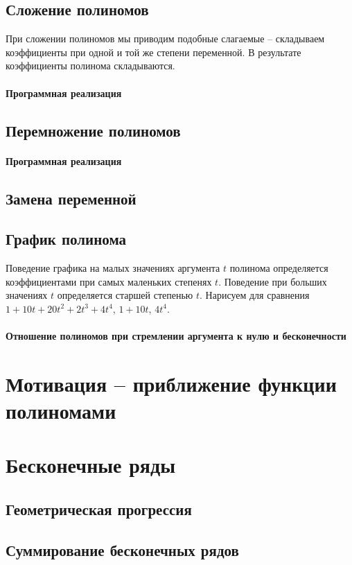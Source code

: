 \documentclass{article}
\begin{document}
\subsection{Сложение полиномов}
При сложении полиномов мы приводим подобные слагаемые -- складываем коэффициенты при одной и той же степени переменной. В результате коэффициенты полинома складываются. 
\paragraph{Программная реализация}
\subsection{Перемножение полиномов}
\paragraph{Программная реализация}
\subsection{Замена переменной}
\subsection{График полинома}
Поведение графика на малых значениях аргумента $t$ полинома определяется коэффициентами при самых маленьких степенях $t$. Поведение при больших значениях $t$ определяется старшей степенью $t$. Нарисуем для сравнения $1+10t+20t^2+2t^3+4t^4$, $1+10t$, $4t^4$. 
\paragraph{Отношение полиномов при стремлении аргумента к нулю и бесконечности}

\section{Мотивация -- приближение функции полиномами}
\section{Бесконечные ряды }
\subsection{Геометрическая прогрессия}
\subsection{Суммирование бесконечных рядов}
\end{document}
